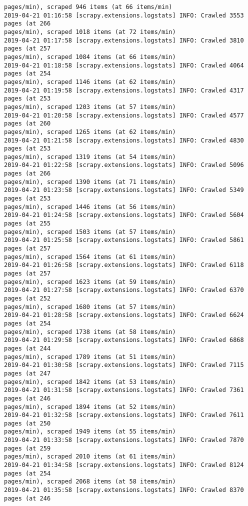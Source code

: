 \documentclass[11pt]{article}
\begin{document}
\begin{Verbatim}[commandchars=\\\{\},fontsize=\footnotesize]
pages/min), scraped 946 items (at 66 items/min)
2019-04-21 01:16:58 [scrapy.extensions.logstats] INFO: Crawled 3553 pages (at 266
pages/min), scraped 1018 items (at 72 items/min)
2019-04-21 01:17:58 [scrapy.extensions.logstats] INFO: Crawled 3810 pages (at 257
pages/min), scraped 1084 items (at 66 items/min)
2019-04-21 01:18:58 [scrapy.extensions.logstats] INFO: Crawled 4064 pages (at 254
pages/min), scraped 1146 items (at 62 items/min)
2019-04-21 01:19:58 [scrapy.extensions.logstats] INFO: Crawled 4317 pages (at 253
pages/min), scraped 1203 items (at 57 items/min)
2019-04-21 01:20:58 [scrapy.extensions.logstats] INFO: Crawled 4577 pages (at 260
pages/min), scraped 1265 items (at 62 items/min)
2019-04-21 01:21:58 [scrapy.extensions.logstats] INFO: Crawled 4830 pages (at 253
pages/min), scraped 1319 items (at 54 items/min)
2019-04-21 01:22:58 [scrapy.extensions.logstats] INFO: Crawled 5096 pages (at 266
pages/min), scraped 1390 items (at 71 items/min)
2019-04-21 01:23:58 [scrapy.extensions.logstats] INFO: Crawled 5349 pages (at 253
pages/min), scraped 1446 items (at 56 items/min)
2019-04-21 01:24:58 [scrapy.extensions.logstats] INFO: Crawled 5604 pages (at 255
pages/min), scraped 1503 items (at 57 items/min)
2019-04-21 01:25:58 [scrapy.extensions.logstats] INFO: Crawled 5861 pages (at 257
pages/min), scraped 1564 items (at 61 items/min)
2019-04-21 01:26:58 [scrapy.extensions.logstats] INFO: Crawled 6118 pages (at 257
pages/min), scraped 1623 items (at 59 items/min)
2019-04-21 01:27:58 [scrapy.extensions.logstats] INFO: Crawled 6370 pages (at 252
pages/min), scraped 1680 items (at 57 items/min)
2019-04-21 01:28:58 [scrapy.extensions.logstats] INFO: Crawled 6624 pages (at 254
pages/min), scraped 1738 items (at 58 items/min)
2019-04-21 01:29:58 [scrapy.extensions.logstats] INFO: Crawled 6868 pages (at 244
pages/min), scraped 1789 items (at 51 items/min)
2019-04-21 01:30:58 [scrapy.extensions.logstats] INFO: Crawled 7115 pages (at 247
pages/min), scraped 1842 items (at 53 items/min)
2019-04-21 01:31:58 [scrapy.extensions.logstats] INFO: Crawled 7361 pages (at 246
pages/min), scraped 1894 items (at 52 items/min)
2019-04-21 01:32:58 [scrapy.extensions.logstats] INFO: Crawled 7611 pages (at 250
pages/min), scraped 1949 items (at 55 items/min)
2019-04-21 01:33:58 [scrapy.extensions.logstats] INFO: Crawled 7870 pages (at 259
pages/min), scraped 2010 items (at 61 items/min)
2019-04-21 01:34:58 [scrapy.extensions.logstats] INFO: Crawled 8124 pages (at 254
pages/min), scraped 2068 items (at 58 items/min)
2019-04-21 01:35:58 [scrapy.extensions.logstats] INFO: Crawled 8370 pages (at 246

\end{Verbatim}
\end{document}
